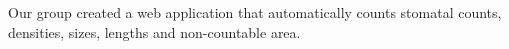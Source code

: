 \documentclass[a4paper,12pt,bibliography=totoc,numbers=noenddot,sfdefaults=false,abstract=true,notitlepage]{scrartcl} %
\begin{document}
	Our group created a web application that automatically counts stomatal counts, densities, sizes, lengths and non-countable area. 


	
	




	
	
	
	
	
	
	\FloatBarrier
	\printbibliography
	
	
	
	

	
	
	
\end{document}
